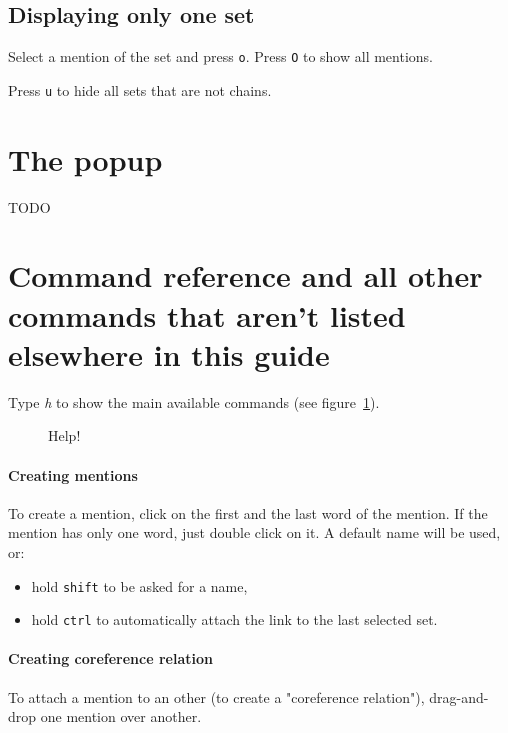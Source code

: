 \documentclass[12pt]{article}
\begin{document}
 \subsection{Displaying only one set}

Select a mention of the set and press \verb|o|.  Press \verb|O| to show all
mentions.

Press \verb|u| to hide all sets that are not chains.

 \section{The popup}

TODO


 \section{Command reference and all other commands that aren't listed
 elsewhere in this guide}

Type \emph{h} to show the main available commands (see figure~\ref{fig:help}).

\begin{figure}[tbp]
\begin{center}
\end{center}
\caption{Help!}
\label{fig:help}
\end{figure}

\paragraph{Creating mentions}  To create a mention, click on the first and
the last word of the mention.  If the mention has only one word, just
double click on it.  A default name will be used, or:
\begin{itemize}
   \item hold \verb|shift| to be asked for a name,
   \item hold \verb|ctrl| to automatically attach the link to the last
      selected set.
\end{itemize}

\paragraph{Creating coreference relation} To attach a mention to an other (to
create a "coreference relation"), drag-and-drop one mention over another.
\end{document}
